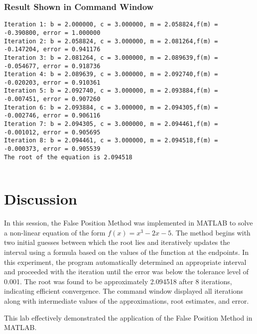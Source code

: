 \documentclass[a4paper,12pt]{article}
\begin{document}
	
	
	\newpage
	\subsubsection{Result Shown in Command Window}
	
	\begin{lstlisting}[style=vscode-light, caption={Command Window for False Position Method } ]
Iteration 1: b = 2.000000, c = 3.000000, m = 2.058824,f(m) = -0.390800, error = 1.000000
Iteration 2: b = 2.058824, c = 3.000000, m = 2.081264,f(m) = -0.147204, error = 0.941176
Iteration 3: b = 2.081264, c = 3.000000, m = 2.089639,f(m) = -0.054677, error = 0.918736
Iteration 4: b = 2.089639, c = 3.000000, m = 2.092740,f(m) = -0.020203, error = 0.910361
Iteration 5: b = 2.092740, c = 3.000000, m = 2.093884,f(m) = -0.007451, error = 0.907260
Iteration 6: b = 2.093884, c = 3.000000, m = 2.094305,f(m) = -0.002746, error = 0.906116
Iteration 7: b = 2.094305, c = 3.000000, m = 2.094461,f(m) = -0.001012, error = 0.905695
Iteration 8: b = 2.094461, c = 3.000000, m = 2.094518,f(m) = -0.000373, error = 0.905539
The root of the equation is 2.094518
		
	\end{lstlisting}
	
	
	
	
	\section{Discussion}
	
	In this session, the False Position Method was implemented in MATLAB to solve a non-linear equation of the form $f(x) = x^3 - 2x - 5$. The method begins with two initial guesses between which the root lies and iteratively updates the interval using a formula based on the values of the function at the endpoints. 
	In this experiment, the program automatically determined an appropriate interval and proceeded with the iteration until the error was below the tolerance level of 0.001. The root was found to be approximately 2.094518 after 8 iterations, indicating efficient convergence. The command window displayed all iterations along with intermediate values of the approximations, root estimates, and error.
	
	This lab effectively demonstrated the application of the False Position Method in MATLAB.
	
	
	
	
	
	
	
	
	
	
\end{document}
